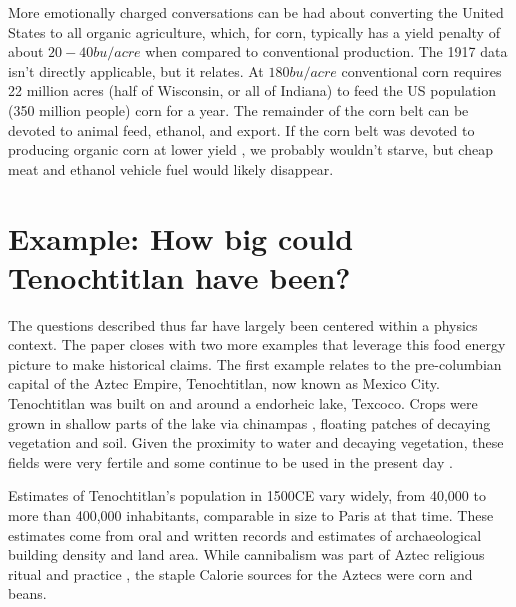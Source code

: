 \documentclass[12pt]{iopart}
\begin{document}
%
%
More emotionally charged conversations can be had about converting the United States to all organic agriculture, which, for corn, typically has a yield penalty of about $20-40bu/acre$ when compared to conventional production.  The 1917 data isn't directly applicable, but it relates. At $180bu/acre$ conventional corn requires 22 million acres (half of Wisconsin, or all of Indiana) to feed the US population (350 million people) corn for a year.  The remainder of the corn belt can be devoted to animal feed, ethanol, and export.  If the corn belt was devoted to producing organic corn at lower yield \cite{organic_corn_yield}, we probably wouldn't starve, but cheap meat and ethanol vehicle fuel would likely disappear.   
%

\clearpage

\section{Example: How big could Tenochtitlan have been?}
The questions described thus far have largely been centered within a physics context.  The paper closes with two more examples that leverage this food energy picture to make historical claims.  The first example relates to the pre-columbian capital of the Aztec Empire, Tenochtitlan, now known as Mexico City.  Tenochtitlan was built on and around a endorheic lake, Texcoco.  Crops were grown in shallow parts of the lake via chinampas \cite{national_geo}, floating patches of decaying vegetation and soil.  Given the proximity to water and decaying vegetation, these fields were very fertile \cite{HortTech_2019,Chinampas_1964} and some continue to be used in the present day \cite{google_earth}.  


Estimates of Tenochtitlan's population in 1500CE vary widely, from 40,000 \cite{40k} to more than 400,000 \cite{400k} inhabitants, comparable in size to Paris at that time. These estimates come from oral and written records and estimates of archaeological building density and land area.   While cannibalism was part of Aztec religious ritual and practice \cite{Aztec_Cannibalism}, the staple Calorie sources for the Aztecs were corn and beans.
\end{document}
